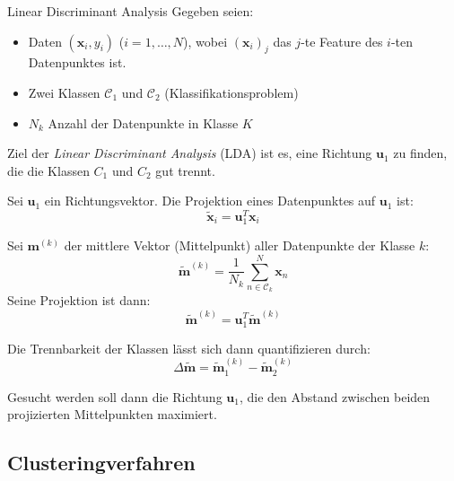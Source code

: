 \begin{defi}{Linear Discriminant Analysis}
    Gegeben seien:
    \begin{itemize}
        \item Daten $(\mathbf{x}_i, y_i)$ ($i=1,\ldots,N$), wobei $(\mathbf{x}_i)_j$ das $j$-te Feature des $i$-ten Datenpunktes ist.
        \item Zwei Klassen $\mathcal{C}_1$ und $\mathcal{C}_2$ (Klassifikationsproblem)
        \item $N_k$ Anzahl der Datenpunkte in Klasse $K$
    \end{itemize}

    Ziel der \emph{Linear Discriminant Analysis} (LDA) ist es, eine Richtung $\mathbf{u}_1$ zu finden, die die Klassen $C_1$ und $C_2$ gut trennt.

    Sei $\mathbf{u}_1$ ein Richtungsvektor.
    Die Projektion eines Datenpunktes auf $\mathbf{u}_1$ ist:
    \[
        \tilde{\mathbf{x}}_i = \mathbf{u}_1^T \mathbf{x}_i
    \]

    Sei $\mathbf{m}^{(k)}$ der mittlere Vektor (Mittelpunkt) aller Datenpunkte der Klasse $k$:
    \[
        \tilde{\mathbf{m}}^{(k)} = \frac{1}{N_k} \sum_{n \in \mathcal{C}_k}^N \mathbf{x}_n
    \]
    Seine Projektion ist dann:
    \[
        \tilde{\mathbf{m}}^{(k)} = \mathbf{u}_1^T \tilde{\mathbf{m}}^{(k)}
    \]

    Die Trennbarkeit der Klassen lässt sich dann quantifizieren durch:
    \[
        \Delta \tilde{\mathbf{m}} = \tilde{\mathbf{m}}^{(k)}_1 - \tilde{\mathbf{m}}^{(k)}_2
    \]

    Gesucht werden soll dann die Richtung $\mathbf{u}_1$, die den Abstand zwischen beiden projizierten Mittelpunkten maximiert.
\end{defi}

\subsection{Clusteringverfahren}
